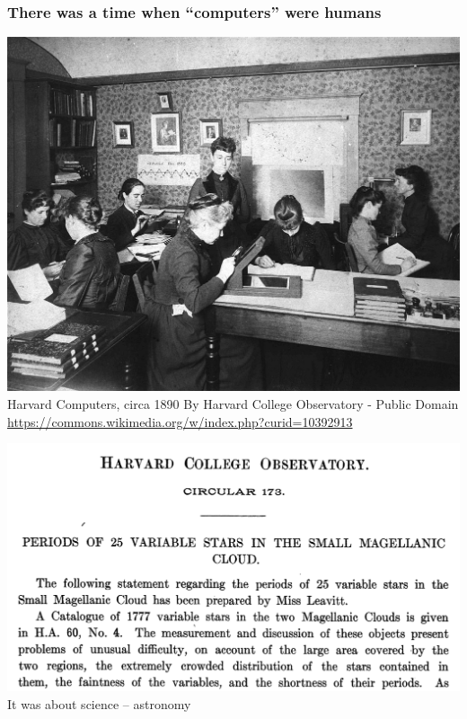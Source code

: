 
\begin{frame}\frametitle{There was a time when ``computers'' were humans}
  
  \begin{minipage}{0.45\textwidth}
    \includegraphics[width=\textwidth]{pic/HarvardComputers.jpg}\newline
    Harvard Computers, circa 1890\newline
    {\tiny By Harvard College Observatory - Public Domain}\newline
    {\tiny \url{https://commons.wikimedia.org/w/index.php?curid=10392913}}
  \end{minipage}\hfill
  \begin{minipage}{0.45\textwidth}
    \includegraphics[width=\textwidth]{pic/harvardobs.jpg}
    \vspace{1.25cm}
    It was about science -- astronomy
  \end{minipage}


\end{frame}
